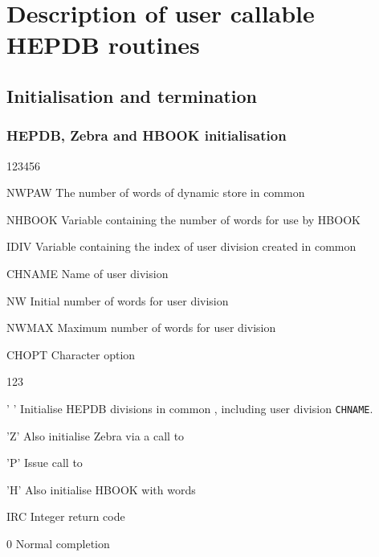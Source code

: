 \chapter{Description of user callable HEPDB routines}

\section{Initialisation and termination}

\subsection{HEPDB, Zebra and HBOOK initialisation}


\begin{DLtt}{123456}
\item[NWPAW]The number of words of dynamic store in common 
\item[NHBOOK]Variable containing the number of words for use by HBOOK
\item[IDIV]Variable containing the index of user division created in common 
\item[CHNAME]Name of user division
\item[NW]Initial number of words for user division
\item[NWMAX]Maximum number of words for user division
\item[CHOPT]Character option
  \begin{DLtt}{123}
    \item[' ']Initialise HEPDB divisions in common ,
              including user division {\tt CHNAME}.
    \item['Z']Also initialise Zebra via a call to 
    \item['P']Issue call to 
    \item['H']Also initialise HBOOK with  words
  \end{DLtt}
\item[IRC]Integer return code
  \begin{DLtt}{1}
    \item[0]Normal completion
  \end{DLtt}
\end{DLtt}

